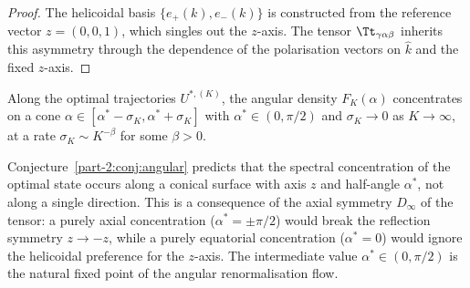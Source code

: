 \begin{proof}
The helicoidal basis $\{e_+(k),e_-(k)\}$ is constructed from the 
reference vector $z = (0,0,1)$, which singles out the $z$-axis. The 
tensor $\Tt_{\gamma\alpha\beta}$ inherits this asymmetry through the 
dependence of the polarisation vectors on $\hat k$ and the fixed 
$z$-axis.
\end{proof}

\begin{conjecture}\label{part-2:conj:angular}
Along the optimal trajectories $U^{\ast,(K)}$, the angular density 
$F_K(\alpha)$ concentrates on a cone 
$\alpha\in[\alpha^\ast-\sigma_K,\alpha^\ast+\sigma_K]$ with 
$\alpha^\ast\in(0,\pi/2)$ and $\sigma_K\to 0$ as $K\to\infty$, at a 
rate $\sigma_K\sim K^{-\beta}$ for some $\beta>0$.
\end{conjecture}

\begin{remark}\label{part-2:rem:spiral-cone}
Conjecture~\ref{part-2:conj:angular} predicts that the spectral 
concentration of the optimal state occurs along a conical surface 
with axis $z$ and half-angle $\alpha^\ast$, not along a single 
direction. This is a consequence of the axial symmetry $D_\infty$ of 
the tensor: a purely axial concentration ($\alpha^\ast = \pm\pi/2$) 
would break the reflection symmetry $z\to -z$, while a purely 
equatorial concentration ($\alpha^\ast = 0$) would ignore the 
helicoidal preference for the $z$-axis. The intermediate value 
$\alpha^\ast\in(0,\pi/2)$ is the natural fixed point of the angular 
renormalisation flow.
\end{remark}

